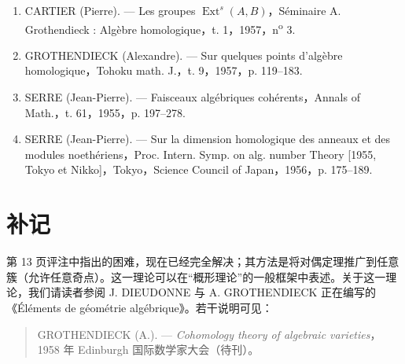\begin{enumerate}
\item[1.]\label{fga1-bib-1} CARTIER (Pierre). — Les groupes $\operatorname{Ext}^s(A,B)$，Séminaire A. Grothendieck : Algèbre homologique，t. 1，1957，n\textsuperscript{o} 3.
\item[2.]\label{fga1-bib-2} GROTHENDIECK (Alexandre). — Sur quelques points d’algèbre homologique，Tohoku math. J.，t. 9，1957，p. 119–183.
\item[3.]\label{fga1-bib-3} SERRE (Jean-Pierre). — Faisceaux algébriques cohérents，Annals of Math.，t. 61，1955，p. 197–278.
\item[4.]\label{fga1-bib-4} SERRE (Jean-Pierre). — Sur la dimension homologique des anneaux et des modules noethériens，Proc. Intern. Symp. on alg. number Theory [1955, Tokyo et Nikko]，Tokyo，Science Council of Japan，1956，p. 175–189.
\end{enumerate}\endgroup
\section*{补记}

第 13 页评注中指出的困难，现在已经完全解决；其方法是将对偶定理推广到任意簇（允许任意奇点）。这一理论可以在“概形理论”的一般框架中表述。关于这一理论，我们请读者参阅 J. DIEUDONNE 与 A. GROTHENDIECK 正在编写的《Éléments de géométrie algébrique》。若干说明可见：

\begin{quote}
GROTHENDIECK (A.). — \emph{Cohomology theory of algebraic varieties}，1958 年 Edinburgh 国际数学家大会（待刊）。
\end{quote}

\begin{flushright}
[1959 年 4 月]
\end{flushright}


\clearpage
\setcounter{chapter}{0}
\renewcommand\fgaAnchorPrefix{fga2}

